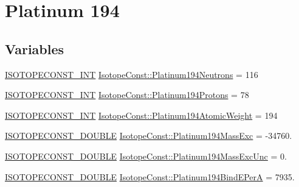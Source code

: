 \hypertarget{group___isotope_const-_platinum-_pt194}{}\section{Platinum 194}
\label{group___isotope_const-_platinum-_pt194}
\subsection*{Variables}
\begin{DoxyCompactItemize}
\item 
\mbox{\hyperlink{group___isotope_const-_macros_ga5f18360b3e99483a35c32d789e62621c}{I\+S\+O\+T\+O\+P\+E\+C\+O\+N\+S\+T\+\_\+\+I\+NT}} \mbox{\hyperlink{group___isotope_const-_platinum-_pt194_ga55488a3f7936ab7f1dc3225ca82c0666}{Isotope\+Const\+::\+Platinum194\+Neutrons}} = 116
\item 
\mbox{\hyperlink{group___isotope_const-_macros_ga5f18360b3e99483a35c32d789e62621c}{I\+S\+O\+T\+O\+P\+E\+C\+O\+N\+S\+T\+\_\+\+I\+NT}} \mbox{\hyperlink{group___isotope_const-_platinum-_pt194_ga60c24ef9180f4c23b8a481f3376c14ed}{Isotope\+Const\+::\+Platinum194\+Protons}} = 78
\item 
\mbox{\hyperlink{group___isotope_const-_macros_ga5f18360b3e99483a35c32d789e62621c}{I\+S\+O\+T\+O\+P\+E\+C\+O\+N\+S\+T\+\_\+\+I\+NT}} \mbox{\hyperlink{group___isotope_const-_platinum-_pt194_gacf196fe2ddf735c3cc9e68979e78d031}{Isotope\+Const\+::\+Platinum194\+Atomic\+Weight}} = 194
\item 
\mbox{\hyperlink{group___isotope_const-_macros_ga8f45a7272ce02c0b4c65c44636ed719a}{I\+S\+O\+T\+O\+P\+E\+C\+O\+N\+S\+T\+\_\+\+D\+O\+U\+B\+LE}} \mbox{\hyperlink{group___isotope_const-_platinum-_pt194_ga51517233e17f589e98ead5b8a8293db3}{Isotope\+Const\+::\+Platinum194\+Mass\+Exc}} = -\/34760.
\item 
\mbox{\hyperlink{group___isotope_const-_macros_ga8f45a7272ce02c0b4c65c44636ed719a}{I\+S\+O\+T\+O\+P\+E\+C\+O\+N\+S\+T\+\_\+\+D\+O\+U\+B\+LE}} \mbox{\hyperlink{group___isotope_const-_platinum-_pt194_gaf5ce897d79175167cc0a7b7efb2c99ae}{Isotope\+Const\+::\+Platinum194\+Mass\+Exc\+Unc}} = 0.
\item 
\mbox{\hyperlink{group___isotope_const-_macros_ga8f45a7272ce02c0b4c65c44636ed719a}{I\+S\+O\+T\+O\+P\+E\+C\+O\+N\+S\+T\+\_\+\+D\+O\+U\+B\+LE}} \mbox{\hyperlink{group___isotope_const-_platinum-_pt194_gacbe8e4b2d549c3dd7e26d9529ef55795}{Isotope\+Const\+::\+Platinum194\+Bind\+E\+PerA}} = 7935.
\item 

\end{DoxyCompactItemize}
